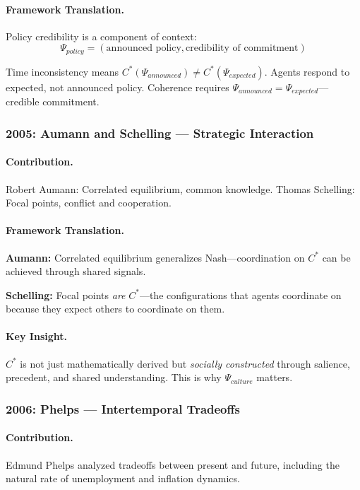 \paragraph{Framework Translation.}
Policy credibility is a component of context:
\begin{equation}
  \Psi_{policy} = (\text{announced policy}, \text{credibility of commitment})
\end{equation}

Time inconsistency means $C^*(\Psi_{announced}) \neq C^*(\Psi_{expected})$.
Agents respond to expected, not announced policy.
Coherence requires $\Psi_{announced} = \Psi_{expected}$---credible commitment.

\subsubsection{2005: Aumann and Schelling --- Strategic Interaction}

\paragraph{Contribution.}
Robert Aumann: Correlated equilibrium, common knowledge.
Thomas Schelling: Focal points, conflict and cooperation.

\paragraph{Framework Translation.}
\textbf{Aumann:} Correlated equilibrium generalizes Nash---coordination on $C^*$ 
can be achieved through shared signals.

\textbf{Schelling:} Focal points \emph{are} $C^*$---the configurations that agents
coordinate on because they expect others to coordinate on them.

\paragraph{Key Insight.}
$C^*$ is not just mathematically derived but \emph{socially constructed}
through salience, precedent, and shared understanding.
This is why $\Psi_{culture}$ matters.

\subsubsection{2006: Phelps --- Intertemporal Tradeoffs}

\paragraph{Contribution.}
Edmund Phelps analyzed tradeoffs between present and future,
including the natural rate of unemployment and inflation dynamics.

